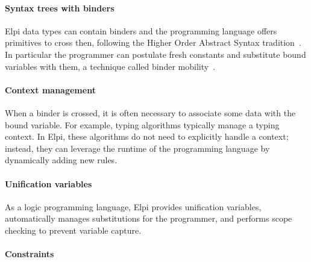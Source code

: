 \documentclass[sigplan,natbib=false]{acmart}
\begin{document}
\paragraph{Syntax trees with binders}
Elpi data types can contain binders and the programming
language offers primitives to cross then, following the Higher Order Abstract
Syntax tradition~\cite{10.1145/960116.54010}.
In particular the programmer can
postulate fresh constants and substitute bound variables with them,
a technique called binder mobility~\cite{miller:hal-01884210}.

\paragraph{Context management}

When a binder is crossed, it is often necessary to associate some data with the
bound variable. For example, typing algorithms typically manage a typing
context. In Elpi, these algorithms do not need to explicitly handle a context;
instead, they can leverage the runtime of the programming language by
dynamically adding new rules.

\paragraph{Unification variables}

As a logic programming language, Elpi provides unification variables,
automatically manages substitutions for the programmer, and performs scope
checking to prevent variable capture.

\paragraph{Constraints}
\end{document}
